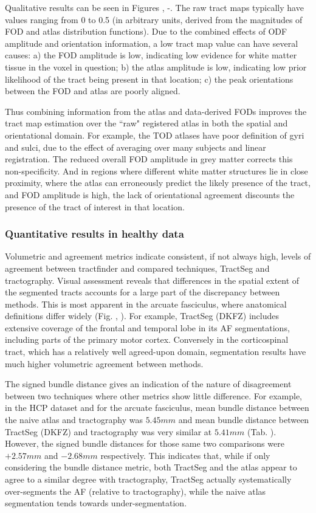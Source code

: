 Qualitative results can be seen in Figures , -.
The raw tract maps typically have values ranging from 0 to 0.5 (in arbitrary units, derived from the magnitudes of FOD and atlas distribution functions).
Due to the combined effects of ODF amplitude and orientation information, a low tract map value can have several causes: a) the FOD amplitude is low, indicating low evidence for white matter tissue in the voxel in question; b) the atlas amplitude is low, indicating low prior likelihood of the tract being present in that location; c) the peak orientations between the FOD and atlas are poorly aligned.

Thus combining information from the atlas and data-derived FODs improves the tract map estimation over the ``raw" registered atlas in both the spatial and orientational domain. For example, the TOD atlases have poor definition of gyri and sulci, due to the effect of averaging over many subjects and linear registration. The reduced overall FOD amplitude in grey matter corrects this non-specificity. And in regions where different white matter structures lie in close proximity, where the atlas can erroneously predict the likely presence of the tract, and FOD amplitude is high, the lack of orientational agreement discounts the presence of the tract of interest in that location.

\subsubsection{Quantitative results in healthy data}

Volumetric and agreement metrics indicate consistent, if not always high, levels of agreement between tractfinder and compared techniques, TractSeg and tractography.
Visual assessment reveals that differences in the spatial extent of the segmented tracts accounts for a large part of the discrepancy between methods.
This is most apparent in the arcuate fasciculus, where anatomical definitions differ widely (Fig. , ).
For example, TractSeg (DKFZ) includes extensive coverage of the frontal and temporal lobe in its AF segmentations, including parts of the primary motor cortex.
Conversely in the corticospinal tract, which has a relatively well agreed-upon domain, segmentation results have much higher volumetric agreement between methods.

The signed bundle distance gives an indication of the nature of disagreement between two techniques where other metrics show little difference.
For example, in the HCP dataset and for the arcuate fasciculus, mean bundle distance between the naive atlas and tractography was $5.45 mm$ and mean bundle distance between TractSeg (DKFZ) and tractography was very similar at $5.41 mm$ (Tab. ).
However, the signed bundle distances for those same two comparisons were $+2.57 mm$ and $-2.68 mm$ respectively.
This indicates that, while if only considering the bundle distance metric, both TractSeg and the atlas appear to agree to a similar degree with tractography, TractSeg actually systematically over-segments the AF (relative to tractography), while the naive atlas segmentation tends towards under-segmentation.


